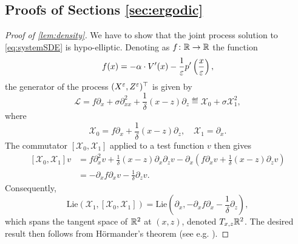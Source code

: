 \documentclass[review,onefignum,onetabnum]{siamonline190516}
\begin{document}
\begin{appendices}
	
\section{Proofs of Sections \ref{sec:ergodic}}\label{ap:ProofsErgodic}

\begin{proof}[Proof of \cref{lem:density}] We have to show that the joint process solution to \eqref{eq:systemSDE} is hypo-elliptic. Denoting as $f\colon \mathbb{R} \to \mathbb{R}$ the function 
	\begin{equation}
	f(x) = -\alpha \cdot V'(x) - \frac1{\varepsilon} p'\left(\frac{x}{\varepsilon}\right),
	\end{equation}
	the generator of the process $(X^\varepsilon, Z^\varepsilon)^\top$ is given by
	\begin{equation}
	\mathcal L = f \partial_x + \sigma \partial_{xx}^2 + \frac1\delta (x - z)\partial_z \eqdef \mathcal X_0 + \sigma \mathcal X_1^2, 
	\end{equation}
	where 
	\begin{equation}
	\mathcal X_0 = f \partial_x + \frac1\delta (x - z)\partial_z, \quad \mathcal X_1 = \partial_x.
	\end{equation}
	The commutator $[\mathcal X_0, \mathcal X_1]$ applied to a test function $v$ then gives
	\begin{equation}
	\begin{aligned}
	[\mathcal X_0, \mathcal X_1]v &= f \partial_x^2 v + \frac1\delta (x - z) \partial_x \partial_z v  - \partial_x\left(f\partial_x v + \frac1\delta (x - z)\partial_z v\right)\\
	&= -\partial_x f \partial_x v - \frac1\delta \partial_z v.
	\end{aligned}
	\end{equation}
	Consequently, 
	\begin{equation}
	\mathrm{Lie}\left(\mathcal X_1, [\mathcal X_0, \mathcal X_1]\right) = \mathrm{Lie} \left(\partial_x, -\partial_x f \partial_x - \frac1\delta\partial_z\right),
	\end{equation}
	which spans the tangent space of $\mathbb{R}^2$ at $(x, z)$, denoted $T_{x, z}\mathbb{R}^2$. The desired result then follows from Hörmander's theorem (see e.g. \cite[Chapter 6]{Pav14}).
\end{proof}


\end{appendices}
\end{document}
